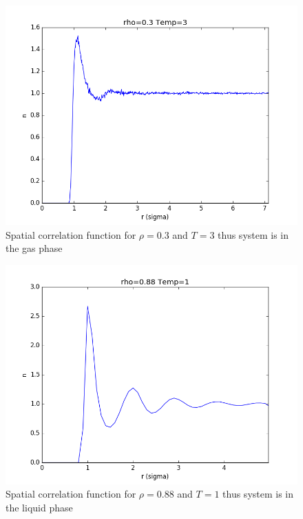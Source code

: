 \documentclass[12pt,a4paper]{report}
\begin{document}
\begin{figure}[H]
\centering
\includegraphics[scale=0.5]{Correlation_rho03_T3_rm35_2.png}
\caption{Spatial correlation function for $\rho=0.3$ and $T=3$ thus system is in the gas phase}
\label{fig:gas_cor}
\end{figure}

\begin{figure}[H]
\centering
\includegraphics[scale=0.5]{Correlation_rho088_T1_rm35_2.png}
\caption{Spatial correlation function for $\rho=0.88$ and $T=1$ thus system is in the liquid phase}
\label{fig:liq_cor}
\end{figure}
\end{document}
